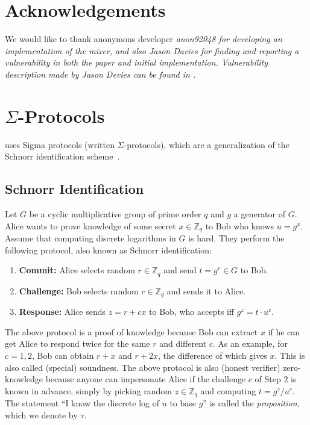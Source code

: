 \documentclass[11pt]{article}
\begin{document}
\section*{Acknowledgements}

We would like to thank anonymous developer \em{anon92048} for developing an implementation of the mixer, and also Jason Davies
for finding and reporting a vulnerability in both the paper and initial implementation. Vulnerability description made by Jason Devies
can be found in \cite{ergomix-vuln}.



\appendix

\section{$\Sigma$-Protocols}
\label{intro:sigma}
\algname uses Sigma protocols (written $\Sigma$-protocols), which are a generalization of the Schnorr identification scheme~\cite{Sch91}. 

\subsection{Schnorr Identification}
 Let $G$ be a cyclic multiplicative group of prime order $q$ and $g$ a generator of $G$. Alice wants to prove knowledge of some secret $x\in \mathbb{Z}_q$ to Bob who knows $u = g^x$. Assume that computing discrete logarithms in $G$ is hard. They perform the following protocol, also known as Schnorr identification:

\begin{enumerate}
	\item \textbf{Commit:} Alice selects random $r\in \mathbb{Z}_q$ and send $t = g^r\in G$ to Bob.
	\item \textbf{Challenge:} Bob selects random $c\in\mathbb{Z}_q$ and sends it to Alice.
	\item \textbf{Response:} Alice sends $z = r + cx$ to Bob, who accepts iff $g^z = t\cdot u^c$.
\end{enumerate}

The above protocol is a proof of knowledge because Bob can extract $x$ if he can get Alice to respond twice for the same $r$ and different $c$. As an example, for $c = 1, 2$, Bob can obtain $r+x$ and $r+2x$, the difference of which gives $x$. This is also called (special) soundness. The above protocol is also (honest verifier) zero-knowledge because anyone can impersonate Alice if the challenge $c$ of Step 2 is known in advance, simply by picking random $z \in\mathbb{Z}_q$ and computing $t = g^z/u^c$. The statement ``I know the discrete log of $u$ to base $g$'' is called the {\em proposition}, which we denote by $\tau$.
\end{document}
